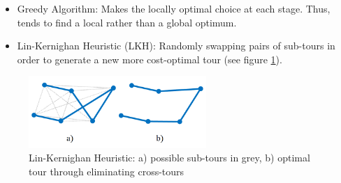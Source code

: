 \begin{itemize}
	\item
	Greedy Algorithm: Makes the locally optimal choice at each stage. Thus, tends to find a local rather than a global optimum.
	\item
	Lin-Kernighan Heuristic (LKH): Randomly swapping pairs of sub-tours in order to generate a new more cost-optimal tour (see figure \ref{pics:lkh}). 
\end{itemize}

\begin{figure} [h]
	\centering
	\includegraphics[width=0.6\textwidth]{images/LKH.png}
	\caption{Lin-Kernighan Heuristic: a) possible sub-tours in grey, b) optimal tour through eliminating cross-tours}
	\label{pics:lkh}
\end{figure}